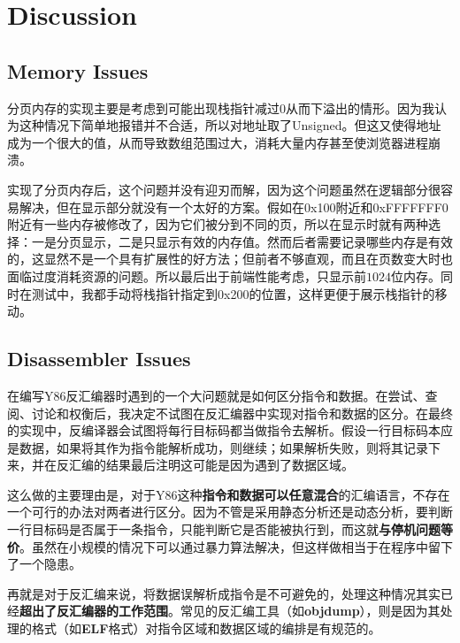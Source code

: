 
\section{Discussion}

\subsection{Memory Issues}

分页内存的实现主要是考虑到可能出现栈指针减过$0$从而下溢出的情形。因为我认为这种情况下简单地报错并不合适，所以对地址取了Unsigned。但这又使得地址成为一个很大的值，从而导致数组范围过大，消耗大量内存甚至使浏览器进程崩溃。

实现了分页内存后，这个问题并没有迎刃而解，因为这个问题虽然在逻辑部分很容易解决，但在显示部分就没有一个太好的方案。假如在0x100附近和0xFFFFFFF0附近有一些内存被修改了，因为它们被分到不同的页，所以在显示时就有两种选择：一是分页显示，二是只显示有效的内存值。然而后者需要记录哪些内存是有效的，这显然不是一个具有扩展性的好方法；但前者不够直观，而且在页数变大时也面临过度消耗资源的问题。所以最后出于前端性能考虑，只显示前$1024$位内存。同时在测试中，我都手动将栈指针指定到0x200的位置，这样更便于展示栈指针的移动。

\subsection{Disassembler Issues}

在编写Y86反汇编器时遇到的一个大问题就是如何区分指令和数据。在尝试、查阅、讨论和权衡后，我决定不试图在反汇编器中实现对指令和数据的区分。在最终的实现中，反编译器会试图将每行目标码都当做指令去解析。假设一行目标码本应是数据，如果将其作为指令能解析成功，则继续；如果解析失败，则将其记录下来，并在反汇编的结果最后注明这可能是因为遇到了数据区域。

这么做的主要理由是，对于Y86这种{\bf 指令和数据可以任意混合}的汇编语言，不存在一个可行的办法对两者进行区分。因为不管是采用静态分析还是动态分析，要判断一行目标码是否属于一条指令，只能判断它是否能被执行到，而这就{\bf 与停机问题等价}。虽然在小规模的情况下可以通过暴力算法解决，但这样做相当于在程序中留下了一个隐患。

再就是对于反汇编来说，将数据误解析成指令是不可避免的，处理这种情况其实已经{\bf 超出了反汇编器的工作范围}。常见的反汇编工具（如{\bf objdump}），则是因为其处理的格式（如{\bf ELF}格式）对指令区域和数据区域的编排是有规范的。

